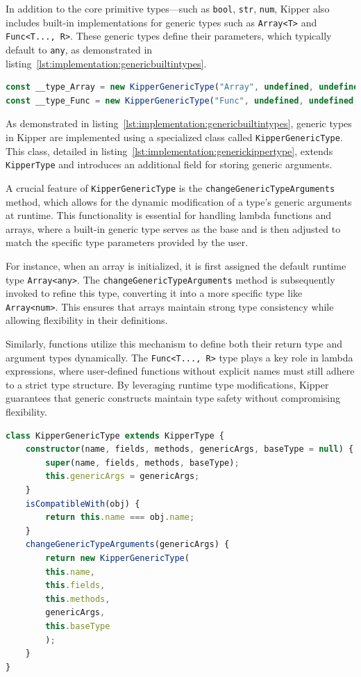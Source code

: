 In addition to the core primitive types—such as \lstinline|bool|, \lstinline|str|, \lstinline|num|, Kipper also includes built-in implementations for generic types such as \lstinline|Array<T>| and \lstinline|Func<T..., R>|. These generic types define their parameters, which typically default to \lstinline|any|, as demonstrated in listing~\ref{lst:implementation:genericbuiltintypes}.

\begin{lstlisting}[language=Typescript,caption=Generic built-in types,label=lst:implementation:genericbuiltintypes]
const __type_Array = new KipperGenericType("Array", undefined, undefined, {T: __type_any});
const __type_Func = new KipperGenericType("Func", undefined, undefined, {T: [], R: __type_any});
\end{lstlisting}

As demonstrated in listing~\ref{lst:implementation:genericbuiltintypes}, generic types in Kipper are implemented using a specialized class called \lstinline|KipperGenericType|. This class, detailed in listing~\ref{lst:implementation:generickippertype}, extends \lstinline|KipperType| and introduces an additional field for storing generic arguments.

A crucial feature of \lstinline|KipperGenericType| is the \lstinline|changeGenericTypeArguments| method, which allows for the dynamic modification of a type's generic arguments at runtime. This functionality is essential for handling lambda functions and arrays, where a built-in generic type serves as the base and is then adjusted to match the specific type parameters provided by the user.

For instance, when an array is initialized, it is first assigned the default runtime type \lstinline|Array<any>|. The \lstinline|changeGenericTypeArguments| method is subsequently invoked to refine this type, converting it into a more specific type like \lstinline|Array<num>|. This ensures that arrays maintain strong type consistency while allowing flexibility in their definitions.

Similarly, functions utilize this mechanism to define both their return type and argument types dynamically. The \lstinline|Func<T..., R>| type plays a key role in lambda expressions, where user-defined functions without explicit names must still adhere to a strict type structure. By leveraging runtime type modifications, Kipper guarantees that generic constructs maintain type safety without compromising flexibility.

\begin{lstlisting}[language=Typescript,caption=Generic Kipper Type,label=lst:implementation:generickippertype]
class KipperGenericType extends KipperType {
	constructor(name, fields, methods, genericArgs, baseType = null) {
		super(name, fields, methods, baseType);
		this.genericArgs = genericArgs;
	}
	isCompatibleWith(obj) {
		return this.name === obj.name;
	}
	changeGenericTypeArguments(genericArgs) {
		return new KipperGenericType(
		this.name,
		this.fields,
		this.methods,
		genericArgs,
		this.baseType
		);
	}
}
\end{lstlisting}

